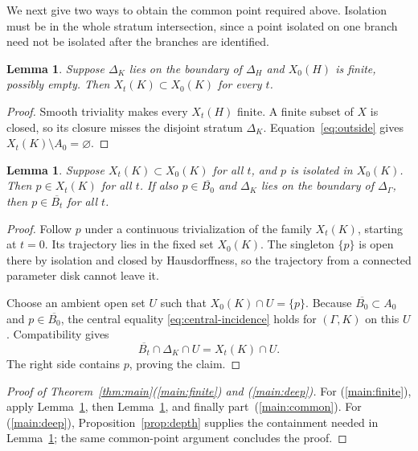 \documentclass[11pt]{article}
\newcommand{\cl}[1]{\overline{#1}}
\newtheorem{lemma}[theorem]{Lemma}
\theoremstyle{definition}
\theoremstyle{remark}
\begin{document}
We next give two ways to obtain the common point required above. Isolation must be in the whole stratum intersection, since a point isolated on one branch need not be isolated after the branches are identified.

\begin{lemma}\label{lem:finite-ancestor}
Suppose $\Delta_K$ lies on the boundary of $\Delta_H$ and $X_0(H)$ is finite, possibly empty. Then $X_t(K)\subset X_0(K)$ for every $t$.
\end{lemma}

\begin{proof}
Smooth triviality makes every $X_t(H)$ finite. A finite subset of $X$ is closed, so its closure misses the disjoint stratum $\Delta_K$. Equation~\eqref{eq:outside} gives $X_t(K)\setminus A_0=\varnothing$.
\end{proof}

\begin{lemma}\label{lem:isolated}
Suppose $X_t(K)\subset X_0(K)$ for all $t$, and $p$ is isolated in $X_0(K)$. Then $p\in X_t(K)$ for all $t$. If also $p\in\cl{B_0}$ and $\Delta_K$ lies on the boundary of $\Delta_\Gamma$, then $p\in\cl{B_t}$ for all $t$.
\end{lemma}

\begin{proof}
Follow $p$ under a continuous trivialization of the family $X_t(K)$, starting at $t=0$. Its trajectory lies in the fixed set $X_0(K)$. The singleton $\{p\}$ is open there by isolation and closed by Hausdorffness, so the trajectory from a connected parameter disk cannot leave it.

Choose an ambient open set $U$ such that $X_0(K)\cap U=\{p\}$. Because $\cl{B_0}\subset A_0$ and $p\in\cl{B_0}$, the central equality \eqref{eq:central-incidence} holds for $(\Gamma,K)$ on this $U$. Compatibility gives
\[
 \cl{B_t}\cap\Delta_K\cap U=X_t(K)\cap U.
\]
The right side contains $p$, proving the claim.
\end{proof}

\begin{proof}[Proof of Theorem~\ref{thm:main}(\ref{main:finite}) and (\ref{main:deep})]
For (\ref{main:finite}), apply Lemma~\ref{lem:finite-ancestor}, then Lemma~\ref{lem:isolated}, and finally part~(\ref{main:common}). For (\ref{main:deep}), Proposition~\ref{prop:depth} supplies the containment needed in Lemma~\ref{lem:isolated}; the same common-point argument concludes the proof.
\end{proof}
\end{document}
